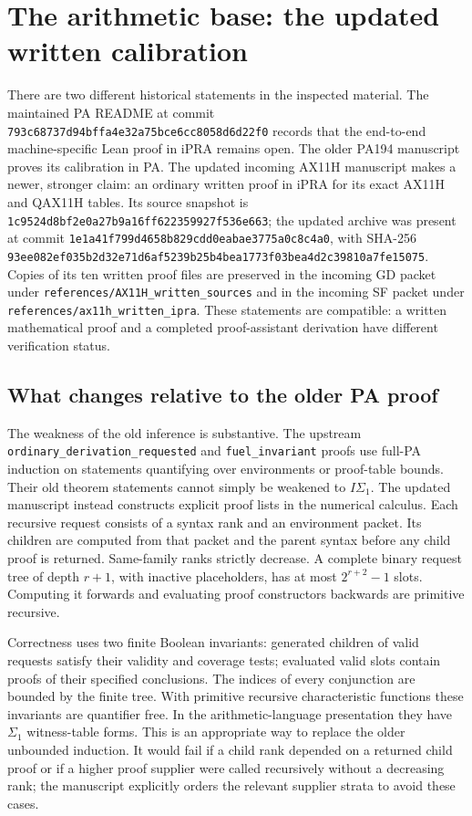\section{The arithmetic base: the updated written calibration}
\label{sec:reviewed-arithmetic-base}

There are two different historical statements in the inspected material.
The maintained PA README at commit
\nolinkurl{793c68737d94bffa4e32a75bce6cc8058d6d22f0}
records that the end-to-end machine-specific Lean proof in iPRA remains
open. The older PA194 manuscript proves its calibration in PA.
The updated incoming AX11H manuscript makes a newer, stronger claim:
an ordinary written proof in iPRA for its exact AX11H and QAX11H tables.
Its source snapshot is
\nolinkurl{1c9524d8bf2e0a27b9a16ff622359927f536e663}; the updated archive
was present at commit
\nolinkurl{1e1a41f799d4658b829cdd0eabae3775a0c8c4a0}, with SHA-256
\nolinkurl{93ee082ef035b2d32e71d6af5239b25b4bea1773f03bea4d2c39810a7fe15075}.
Copies of its ten written proof files are preserved in the incoming GD
packet under \texttt{references/AX11H\_written\_sources} and in the
incoming SF packet under \texttt{references/ax11h\_written\_ipra}.
These statements are compatible: a written mathematical proof and a
completed proof-assistant derivation have different verification status.

\subsection{What changes relative to the older PA proof}

The weakness of the old inference is substantive. The upstream
\texttt{ordinary\_derivation\_requested} and
\texttt{fuel\_invariant} proofs use full-PA induction on statements
quantifying over environments or proof-table bounds. Their old theorem
statements cannot simply be weakened to $I\Sigma_1$.
The updated manuscript instead constructs explicit proof lists in the
numerical calculus. Each recursive request consists of a syntax rank and
an environment packet. Its children are computed from that packet and
the parent syntax before any child proof is returned. Same-family ranks
strictly decrease. A complete binary request tree of depth $r+1$, with
inactive placeholders, has at most $2^{r+2}-1$ slots. Computing it forwards
and evaluating proof constructors backwards are primitive recursive.

Correctness uses two finite Boolean invariants: generated children of
valid requests satisfy their validity and coverage tests; evaluated valid
slots contain proofs of their specified conclusions. The indices of
every conjunction are bounded by the finite tree. With primitive recursive
characteristic functions these invariants are quantifier free. In the
arithmetic-language presentation they have $\Sigma_1$ witness-table forms.
This is an appropriate way to replace the older unbounded induction.
It would fail if a child rank depended on a returned child proof or if
a higher proof supplier were called recursively without a decreasing rank;
the manuscript explicitly orders the relevant supplier strata to avoid
these cases.

